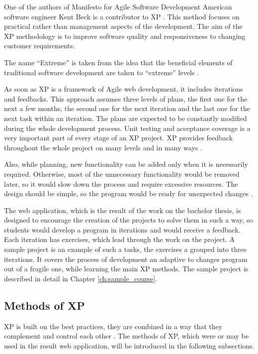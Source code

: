 One of the authors of Manifesto for Agile Software Development American software engineer Kent Beck is a contributor to XP \cite{xp_explained}. This method focuses on practical rather than management aspects of the development. The aim of the XP methodology is to improve software quality and responsiveness to changing customer requirements.

The name ``Extreme'' is taken from the idea that the beneficial elements of traditional software development are taken to ``extreme'' levels \cite[Preface]{xp_explained}.

As soon as XP is a framework of Agile web development, it includes iterations and feedbacks. This approach assumes three levels of plans, the first one for the next a few months, the second one for the next iteration and the last one for the next task within an iteration. The plans are expected to be constantly modified during the whole development process. Unit testing and acceptance coverage is a very important part of every stage of an XP project. XP provides feedback throughout the whole project on many levels and in many ways \cite[Planning/Feedback loops]{xp_intro}.

Also, while planning, new functionality can be added only when it is necessarily required. Otherwise, most of the unnecessary functionality would be removed later, so it would slow down the process and require excessive resources. The design should be simple, so the program would be ready for unexpected changes \cite{xp_early}.

The web application, which is the result of the work on the bachelor thesis, is designed to encourage the creation of the projects to solve them in such a way, so students would develop a program in iterations and would receive a feedback. Each iteration has exercises, which lead through the work on the project. A sample project is an example of such a tasks, the exercises a grouped into three iterations. It covers the process of development an adaptive to changes program out of a fragile one, while learning the main XP methods. The sample project is described in detail in Chapter \ref{ch:sample_course}.

\subsection{Methods of XP}
XP is built on the best practices, they are combined in a way that they complement and control each other \cite[Foreword]{xp_explained}. The methods of XP, which were or may be used in the result web application, will be introduced in the following subsections.

